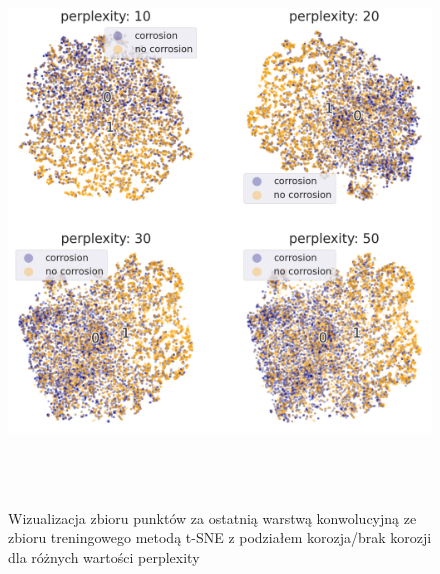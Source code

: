 \documentclass[polish,12pt]{aghthesis}
\begin{document}
\begin{figure}[H]
    \centering
    \includegraphics[width=15cm, height=15cm]{images/tsne_binary.png}
    \caption{Wizualizacja zbioru punktów za ostatnią warstwą konwolucyjną ze zbioru treningowego metodą t-SNE z podziałem korozja/brak korozji dla różnych wartości perplexity}
    \label{fig:tsne-2-30}
\end{figure}
\end{document}

